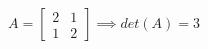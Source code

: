 \documentclass[preview]{standalone}
\begin{document}
\begin{align*}
A = \begin{bmatrix} 2 & 1 \\ 1 & 2 \end{bmatrix} \implies det(A) = 3
\end{align*}
\end{document}
